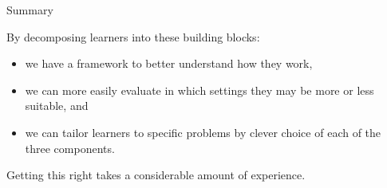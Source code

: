 \documentclass[11pt,compress,t,notes=noshow, xcolor=table]{beamer}
\begin{document}

\begin{vbframe}{Summary}


  By decomposing learners into these building blocks:

  \lz

  \begin{itemize}

    \item we have a framework to better understand how they work,

    \item we can more easily evaluate in which settings they may be more or less
    suitable, and

    \item we can tailor learners to specific problems by clever choice of each
    of the three components.

  \end{itemize}




\lz

Getting this right takes a considerable amount of experience.

\end{vbframe}



\endlecture
\end{document}
